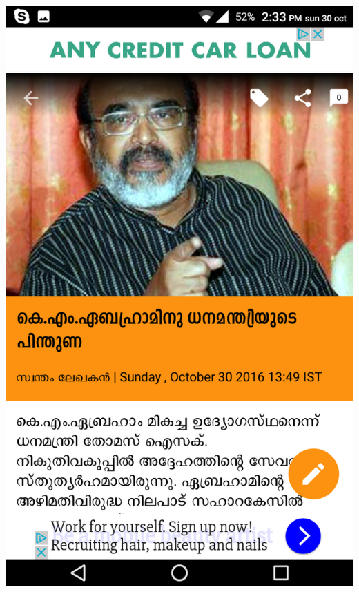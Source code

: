 \documentclass[a4paper, 11pt]{article}
\begin{document}
\includegraphics[scale=0.15]{sf.png}
\end{document}
